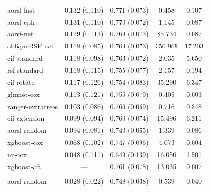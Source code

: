 \documentclass{article}\usepackage[]{graphicx}\usepackage[]{xcolor}
\newenvironment{knitrout}{}{} %
\begin{document}
\begin{knitrout}
\begin{longtable}[t]{lcccc}
\endfoot
\bottomrule
\endlastfoot
\addlinespace[0.3em]
\multicolumn{5}{l}{\textit{\textbf{Overall}}}\\
\hline
\hspace{1em}aorsf-fast & 0.132 (0.110) & 0.771 (0.073) & 0.458 & 0.107\\
\hspace{1em}aorsf-cph & 0.131 (0.110) & 0.770 (0.072) & 1.145 & 0.087\\
\hspace{1em}aorsf-net & 0.129 (0.113) & 0.769 (0.073) & 85.734 & 0.087\\
\hspace{1em}obliqueRSF-net & 0.118 (0.085) & 0.769 (0.073) & 356.969 & 17.203\\
\hspace{1em}cif-standard & 0.118 (0.098) & 0.763 (0.072) & 2.035 & 5.650\\
\hspace{1em}rsf-standard & 0.118 (0.115) & 0.755 (0.077) & 2.157 & 0.194\\
\hspace{1em}cif-rotate & 0.117 (0.126) & 0.754 (0.083) & 35.290 & 6.347\\
\hspace{1em}glmnet-cox & 0.113 (0.121) & 0.755 (0.079) & 0.405 & 0.003\\
\hspace{1em}ranger-extratrees & 0.103 (0.086) & 0.760 (0.069) & 0.716 & 0.848\\
\hspace{1em}cif-extension & 0.099 (0.094) & 0.760 (0.074) & 15.496 & 6.211\\
\hspace{1em}aorsf-random & 0.094 (0.081) & 0.740 (0.065) & 1.339 & 0.086\\
\hspace{1em}xgboost-cox & 0.068 (0.102) & 0.747 (0.096) & 4.073 & 0.004\\
\hspace{1em}nn-cox & 0.048 (0.111) & 0.649 (0.139) & 16.050 & 1.501\\
\hspace{1em}xgboost-aft & --- & 0.761 (0.078) & 13.035 & 0.007\\
\addlinespace[0.3em]
\multicolumn{5}{l}{\textit{\textbf{ACTG 320; AIDS diagnosis, n = 1151, p = 12}}}\\
\hline
\hspace{1em}aorsf-random & 0.028 (0.022) & 0.748 (0.038) & 0.539 & 0.040\\

\end{longtable}
\end{knitrout}
\end{document}

